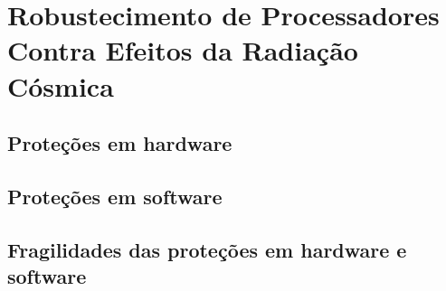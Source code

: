 \chapter{Robustecimento de Processadores Contra Efeitos da Radiação Cósmica}
\section{Proteções em hardware}
\section{Proteções em software}
\section{Fragilidades das proteções em hardware e software}